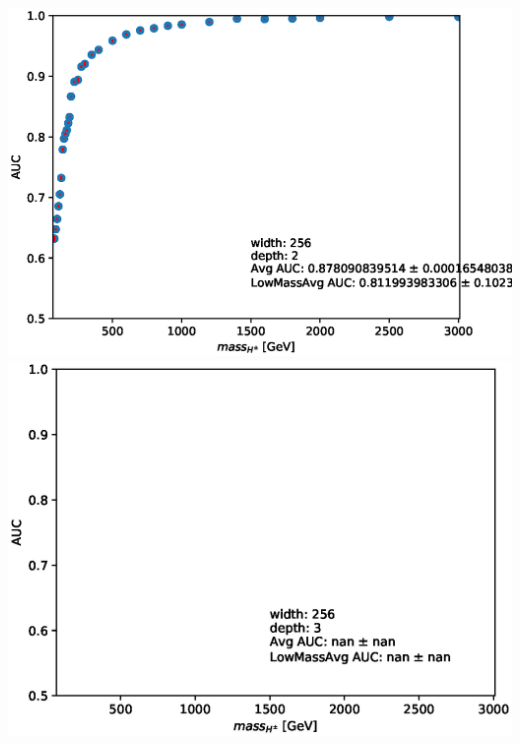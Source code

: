 \documentclass[aspectratio=169,xcolor=table]{beamer}
\begin{document}
\begin{frame}
\begin{columns}
      \includegraphics[height=.25\textheight,keepaspectratio=true]{AUC_Plots/model_GB_1024_channel_taulep_mass_80to3000_ntracks_1_nfolds_5_fold_4_nvars_19_batch_size_1024_epochs_1000_dense_layer_size_256_activation_function_LeakyRelu_depth_2_loss_binary_crossentropy_dropout_0.1_alpha_0.05.eps}
      \includegraphics[height=.25\textheight,keepaspectratio=true]{AUC_Plots/model_GB_1024_channel_taulep_mass_80to3000_ntracks_1_nfolds_5_fold_4_nvars_19_batch_size_1024_epochs_1000_dense_layer_size_256_activation_function_LeakyRelu_depth_3_loss_binary_crossentropy_dropout_0.1_alpha_0.05.eps}

\end{columns}
\end{frame}
\end{document}
